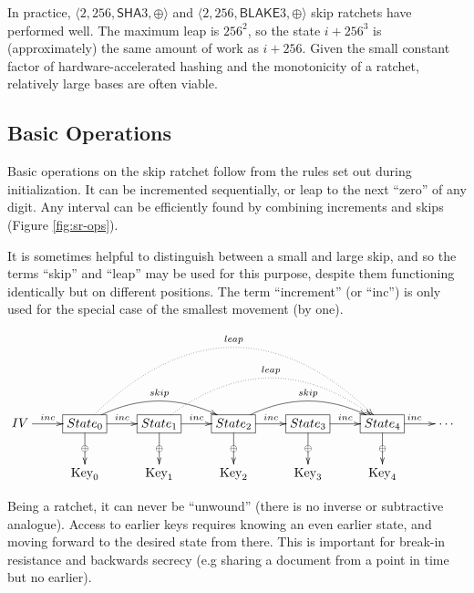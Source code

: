 \documentclass[twocolumn]{article}
\begin{document}
	In practice, $\langle 2, 256, \textsf{SHA}3, \oplus \rangle$ and $\langle 2, 256, \textsf{BLAKE}3, \oplus \rangle$ skip ratchets have performed well. The maximum leap is $256^{2}$, so the state $i + 256^{3}$ is (approximately) the same amount of work as $i + 256$. Given the small constant factor of hardware-accelerated hashing and the monotonicity of a ratchet, relatively large bases are often viable.

	\subsection{Basic Operations}
	
	Basic operations on the skip ratchet follow from the rules set out during initialization. It can be incremented sequentially, or leap to the next ``zero'' of any digit. Any interval can be efficiently found by combining increments and skips (Figure \ref{fig:sr-ops}).
	
	It is sometimes helpful to distinguish between a small and large skip, and so the terms ``skip'' and ``leap'' may be used for this purpose, despite them functioning identically but on different positions. The term ``increment'' (or ``inc'') is only used for the special case of the smallest movement (by one).
	
	\begin{figure*}[h]
		\centering
		
		$\xymatrix{
			IV \ar[r]^<<<<<{inc} 
				& *+[F]{State_{0}}
					\ar[d]|\oplus
					\ar[r]^{inc}
					\ar@/^1.5pc/[rr]^{skip}
					\ar@{.>}@/^5pc/[rrrr]^{leap}
				& *+[F]{State_{1}}
					\ar[d]|\oplus
					\ar[r]^{inc}
					\ar@{.>}@/^3pc/[rrr]^{leap}
				& *+[F]{State_{2}} 
					\ar[d]|\oplus
					\ar[r]^{inc}
					\ar@/^1.5pc/[rr]^{skip}
				& *+[F]{State_{3}}
					\ar[d]|\oplus
					\ar[r]^{inc}
				& *+[F]{State_{4}}
					\ar[d]|\oplus
					\ar[r]^{inc}
				& \cdots
			\\
				& \text{Key}_{0}
				& \text{Key}_{1}
				& \text{Key}_{2}
				& \text{Key}_{3}
				& \text{Key}_{4}
		}$
		
		\caption{Binary Skip Ratchet Operations}
		\label{fig:sr-ops}
	\end{figure*}

	Being a ratchet, it can never be ``unwound'' (there is no inverse or subtractive analogue). Access to earlier keys requires knowing an even earlier state, and moving forward to the desired state from there. This is important for break-in resistance and backwards secrecy (e.g sharing a document from a point in time but no earlier).
\end{document}
